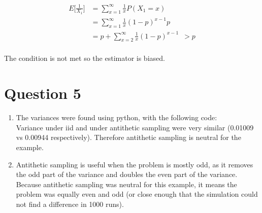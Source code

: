 \documentclass[10pt,a4paper]{article}
\begin{document}
\begin{align*}
	E\bigg[\frac{1}{X_1}\bigg] &= \sum_{x=1}^{\infty}\frac{1}{x}P(X_1 = x)\\
	&= \sum_{x=1}^{\infty}\frac{1}{x}(1-p)^{x-1}p\\
	&= p + \sum_{x=2}^{\infty}\frac{1}{x}(1-p)^{x-1} \, \, \, > p\\
\end{align*}

The condition is not met so the estimator is biased.

\newpage
\section*{Question 5}
\begin{enumerate}
\item
The variances were found using python, with the following code:\\


Variance under iid and under antithetic sampling were very similar (0.01009 vs 0.00944 respectively). Therefore antithetic sampling is neutral for the example.

\item
Antithetic sampling is useful when the problem is mostly odd, as it removes the odd part of the variance and doubles the even part of the variance. Because antithetic sampling was neutral for this example, it means the problem was equally even and odd (or close enough that the simulation could not find a difference in 1000 runs).
\end{enumerate}
\newpage
\end{document}
